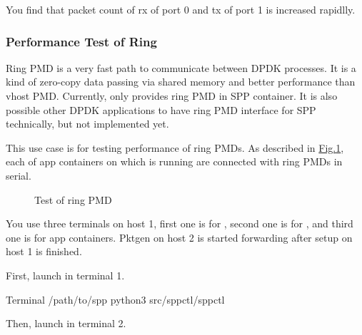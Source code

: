\documentclass[a4paper,11pt,openany,oneside,english]{sphinxmanual}
\begin{document}
You find that packet count of rx of port 0 and tx of port 1
is increased rapidlly.


\subsubsection{Performance Test of Ring}
\label{\detokenize{tools/sppc/usecases:performance-test-of-ring}}\label{\detokenize{tools/sppc/usecases:sppc-usecases-test-ring}}
Ring PMD is a very fast path to communicate between DPDK processes.
It is a kind of zero-copy data passing via shared memory and better
performance than vhost PMD.
Currently, only  provides ring PMD in SPP container.
It is also possible other DPDK applications to have ring PMD interface
for SPP technically,
but not implemented yet.

This use case is for testing performance of ring PMDs.
As described in \hyperref[\detokenize{tools/sppc/usecases:figure-sppc-usecase-ring}]{Fig.\@ \ref{\detokenize{tools/sppc/usecases:figure-sppc-usecase-ring}}},
each of app containers on which  is running are connected
with ring PMDs in serial.

\begin{figure}[htbp]
\centering
\capstart

\noindent{}
\caption{Test of ring PMD}\label{\detokenize{tools/sppc/usecases:id2}}\label{\detokenize{tools/sppc/usecases:figure-sppc-usecase-ring}}\end{figure}

You use three terminals on host 1, first one is for ,
second one is for , and third one is for  app containers.
Pktgen on host 2 is started forwarding after setup on host 1 is finished.

First, launch  in terminal 1.

\begin{sphinxVerbatim}[commandchars=\\\{\},formatcom=\footnotesize]
 Terminal 
  /path/to/spp
 python3 src/spp\PYGZhy{}ctl/spp\PYGZhy{}ctl
\end{sphinxVerbatim}

Then, launch  in terminal 2.
\end{document}
